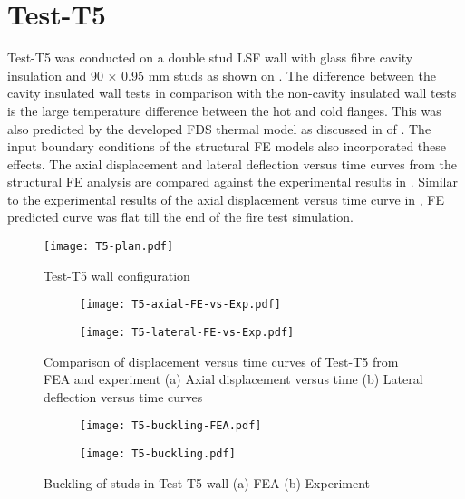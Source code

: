 \section*{Test-T5}

Test-T5 was conducted on a double stud LSF wall with glass fibre cavity insulation and 90 $\times$ 0.95 mm studs as shown on . The difference between the cavity insulated wall tests in comparison with the non-cavity insulated wall tests is the large temperature difference between the hot and cold flanges. This was also predicted by the developed FDS thermal model as discussed in  of . The input boundary conditions of the structural FE models also incorporated these effects. The axial displacement and lateral deflection versus time curves from the structural FE analysis are compared against the experimental results in . Similar to the experimental results of the axial displacement versus time curve in , FE predicted curve was flat till the end of the fire test simulation. 
\begin{figure}[!htbp]
	\centering
			\texttt{[image: T5-plan.pdf]}\\
		\caption{Test-T5 wall configuration}
		\label{fig:T5-plan-FEA}
\end{figure}
\begin{figure}[!htbp]
	\centering
	\begin{subfigure}[b]{0.7\textwidth}
		\centering
		\texttt{[image: T5-axial-FE-vs-Exp.pdf]}
		\caption{}
		\label{subfig:T5-axial-FE-vs-Exp}
	\end{subfigure}
	\begin{subfigure}[b]{0.7\textwidth}
		\centering
		\texttt{[image: T5-lateral-FE-vs-Exp.pdf]}
		\caption{}
		\label{subfig:T5-lateral-FE-vs-Exp}
	\end{subfigure}
	   \caption{Comparison of displacement versus time curves of Test-T5 from FEA and experiment (a) Axial displacement versus time (b) Lateral deflection versus time curves}
	   \label{fig:T5-structural-FE-vs-Exp}
\end{figure} 
\begin{figure}[!htbp]
	\centering
	\begin{subfigure}[b]{0.8\textwidth}
		\centering
		\texttt{[image: T5-buckling-FEA.pdf]}
		\caption{}
		\label{subfig:T5-buckling-FEA}
	\end{subfigure}
	\begin{subfigure}[b]{0.3\textwidth}
		\centering
		\texttt{[image: T5-buckling.pdf]}
		\caption{}
		\label{subfig:T5-buckling-FEA-Exp}
	\end{subfigure}
	   \caption{Buckling of studs in Test-T5 wall (a) FEA (b) Experiment}
	   \label{fig:T5-buckling-FE-vs-Exp}
\end{figure} 

